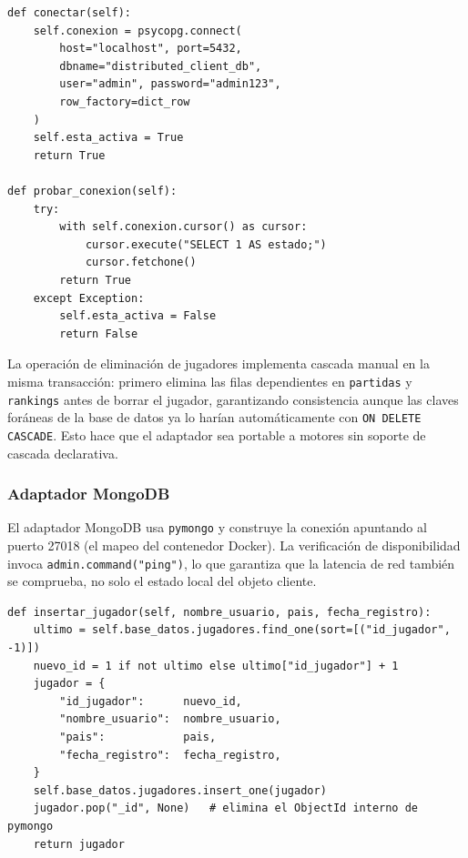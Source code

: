 \documentclass[12pt,letterpaper]{article}
\begin{document}
\begin{lstlisting}[style=pycode, caption={Conexión y prueba de disponibilidad en \texttt{PostgresConnection}}]
def conectar(self):
    self.conexion = psycopg.connect(
        host="localhost", port=5432,
        dbname="distributed_client_db",
        user="admin", password="admin123",
        row_factory=dict_row
    )
    self.esta_activa = True
    return True

def probar_conexion(self):
    try:
        with self.conexion.cursor() as cursor:
            cursor.execute("SELECT 1 AS estado;")
            cursor.fetchone()
        return True
    except Exception:
        self.esta_activa = False
        return False
\end{lstlisting}

La operación de eliminación de jugadores implementa cascada manual en la misma transacción:
primero elimina las filas dependientes en \texttt{partidas} y \texttt{rankings} antes de borrar
el jugador, garantizando consistencia aunque las claves foráneas de la base de datos ya lo
harían automáticamente con \texttt{ON DELETE CASCADE}. Esto hace que el adaptador sea
portable a motores sin soporte de cascada declarativa.

\subsubsection{Adaptador MongoDB}

El adaptador MongoDB usa \texttt{pymongo} y construye la conexión apuntando al puerto 27018
(el mapeo del contenedor Docker). La verificación de disponibilidad invoca
\texttt{admin.command("ping")}, lo que garantiza que la latencia de red también se comprueba,
no solo el estado local del objeto cliente.

\begin{lstlisting}[style=pycode, caption={Generación de ID manual en \texttt{MongoConnection.insertar\_jugador}}]
def insertar_jugador(self, nombre_usuario, pais, fecha_registro):
    ultimo = self.base_datos.jugadores.find_one(sort=[("id_jugador", -1)])
    nuevo_id = 1 if not ultimo else ultimo["id_jugador"] + 1
    jugador = {
        "id_jugador":      nuevo_id,
        "nombre_usuario":  nombre_usuario,
        "pais":            pais,
        "fecha_registro":  fecha_registro,
    }
    self.base_datos.jugadores.insert_one(jugador)
    jugador.pop("_id", None)   # elimina el ObjectId interno de pymongo
    return jugador
\end{lstlisting}
\end{document}
